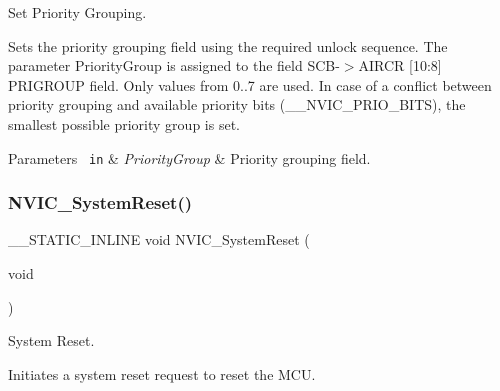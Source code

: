 Set Priority Grouping. 

Sets the priority grouping field using the required unlock sequence. The parameter Priority\+Group is assigned to the field S\+C\+B-\/$>$A\+I\+R\+CR \mbox{[}10\+:8\mbox{]} P\+R\+I\+G\+R\+O\+UP field. Only values from 0..7 are used. In case of a conflict between priority grouping and available priority bits (\+\_\+\+\_\+\+N\+V\+I\+C\+\_\+\+P\+R\+I\+O\+\_\+\+B\+I\+TS), the smallest possible priority group is set. 
\begin{DoxyParams}[1]{Parameters}
\mbox{\texttt{ in}}  & {\em Priority\+Group} & Priority grouping field. \\
\hline
\end{DoxyParams}
\mbox{\label{group__CMSIS__Core__NVICFunctions_ga1143dec48d60a3d6f238c4798a87759c}} 
\subsubsection{\texorpdfstring{NVIC\_SystemReset()}{NVIC\_SystemReset()}}
{\footnotesize\ttfamily \+\_\+\+\_\+\+S\+T\+A\+T\+I\+C\+\_\+\+I\+N\+L\+I\+NE void N\+V\+I\+C\+\_\+\+System\+Reset (\begin{DoxyParamCaption}\item[{void}]{ }\end{DoxyParamCaption})}



System Reset. 

Initiates a system reset request to reset the M\+CU. 